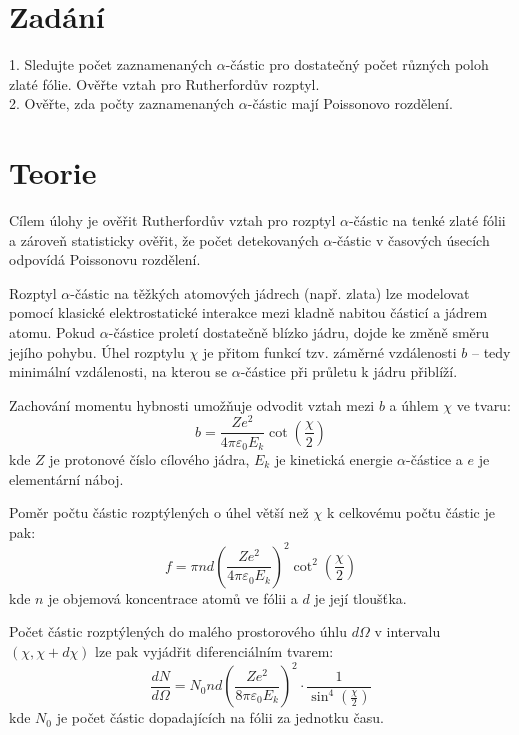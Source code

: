 \documentclass[czech,11pt,a4paper]{article}
\begin{document}
	\begin{multicols}{2}
		\section{Zadání}
		1. Sledujte počet zaznamenaných $\alpha$-částic pro dostatečný počet různých poloh zlaté fólie. Ověřte vztah pro Rutherfordův rozptyl.\\
		2. Ověřte, zda počty zaznamenaných $\alpha$-částic mají Poissonovo rozdělení.
		
		
		\section{Teorie}
		
		Cílem úlohy je ověřit Rutherfordův vztah pro rozptyl $\alpha$-částic na tenké zlaté fólii a zároveň statisticky ověřit, že počet detekovaných $\alpha$-částic v časových úsecích odpovídá Poissonovu rozdělení.
		
		Rozptyl $\alpha$-částic na těžkých atomových jádrech (např. zlata) lze modelovat pomocí klasické elektrostatické interakce mezi kladně nabitou částicí a jádrem atomu. Pokud $\alpha$-částice proletí dostatečně blízko jádru, dojde ke změně směru jejího pohybu. Úhel rozptylu $\chi$ je přitom funkcí tzv. záměrné vzdálenosti $b$ – tedy minimální vzdálenosti, na kterou se $\alpha$-částice při průletu k jádru přiblíží.
		
		Zachování momentu hybnosti umožňuje odvodit vztah mezi $b$ a úhlem $\chi$ ve tvaru:
		\begin{equation}
			b = \frac{Z e^2}{4 \pi \varepsilon_0 E_k} \cot\left(\frac{\chi}{2}\right)
		\end{equation}
		kde $Z$ je protonové číslo cílového jádra, $E_k$ je kinetická energie $\alpha$-částice a $e$ je elementární náboj.
		
		Poměr počtu částic rozptýlených o úhel větší než $\chi$ k celkovému počtu částic je pak:
		\begin{equation}
			f = \pi n d \left( \frac{Z e^2}{4 \pi \varepsilon_0 E_k} \right)^2 \cot^2\left(\frac{\chi}{2}\right)
		\end{equation}
		kde $n$ je objemová koncentrace atomů ve fólii a $d$ je její tloušťka.
		
		Počet částic rozptýlených do malého prostorového úhlu $d\Omega$ v intervalu $(\chi, \chi + d\chi)$ lze pak vyjádřit diferenciálním tvarem:
		\begin{equation}
			\frac{dN}{d\Omega} = N_0 n d \left( \frac{Z e^2}{8 \pi \varepsilon_0 E_k} \right)^2 \cdot \frac{1}{\sin^4\left(\frac{\chi}{2}\right)}
		\end{equation}
		kde $N_0$ je počet částic dopadajících na fólii za jednotku času.
		

\end{multicols}
\end{document}
